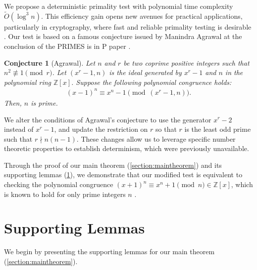 \documentclass{article}
\theoremstyle{plain}
\newtheorem*{conjecture*}{Conjecture}
\theoremstyle{definition}
\newcommand{\Z}{\mathbb{Z}}
\begin{document}
We propose a deterministic primality test with polynomial time complexity $\tilde{O}(\log^3 n)$. This efficiency gain opens new avenues for practical applications, particularly in cryptography, where fast and reliable primality testing is desirable \cite{lenstra1987elliptic}. Our test is based on a famous conjecture issued by Manindra Agrawal at the conclusion of the PRIMES is in P paper \cite{aks2002}.
\begin{conjecture*}[Agrawal]
Let $n$ and $r$ be two coprime positive integers such that $n^2 \not\equiv 1 \pmod{r}$. Let $(x^r-1,n)$ is the ideal generated by $x^r-1$ and $n$ in the polynomial ring $\Z[x]$. Suppose the following polynomial congruence holds:
\begin{align*}
    (x - 1)^n \equiv x^n - 1 \pmod{(x^r - 1,n)} .
\end{align*}
Then, $n$ is prime.
\end{conjecture*}
We alter the conditions of Agrawal's conjecture to use the generator $x^r-2$ instead of $x^r-1$, and update the restriction on $r$ so that $r$ is the least odd prime such that $r \nmid n (n-1)$. These changes allow us to leverage specific number theoretic properties to establish determinism, which were previously unavailable.

Through the proof of our main theorem (\cref{section:maintheorem}) and its supporting lemmas (\cref{section:supportinglemmas}), we demonstrate that our modified test is equivalent to checking the polynomial congruence $(x+1)^n \equiv x^n+1 \pmod{n} \in \mathbb{Z}[x]$, which is known to hold for only prime integers $n$ \cite{granville2004primes}.

\section{Supporting Lemmas} \label{section:supportinglemmas}
We begin by presenting the supporting lemmas for our main theorem (\cref{section:maintheorem}).
\end{document}
